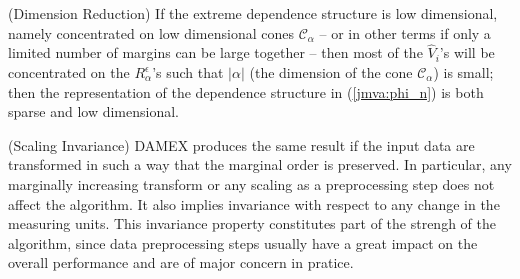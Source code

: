\begin{remark} ({\sc Dimension Reduction})
If the extreme dependence structure is low dimensional, namely
concentrated on low dimensional cones $\mathcal{C}_\alpha$ -- or in other terms if only a
limited number of margins can be large together -- then most of the
$\widehat V_i$'s will be concentrated on the $R_\alpha^\epsilon$'s
such that  $|\alpha|$ (the dimension of the cone $\mathcal{C}_\alpha$)
is small; then the
representation of the dependence structure
 in (\ref{jmva:phi_n}) is both sparse and low dimensional.
\end{remark}

\begin{remark} ({\sc Scaling Invariance})
DAMEX produces the same result if the input data are transformed in such a way that the marginal order is preserved. In particular, any marginally increasing transform or any scaling as a preprocessing step does not affect the algorithm. It also implies invariance with respect to any change in the measuring units. This invariance property constitutes part of the strengh of the algorithm, since 
data preprocessing steps usually have a great impact on the overall performance and are of major concern in pratice.
\end{remark}

